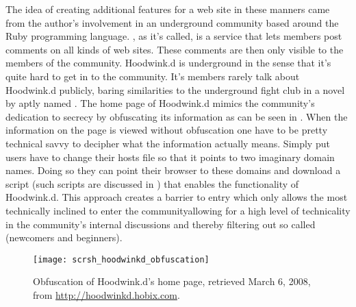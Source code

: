The idea of creating additional features for a web site in these manners
came from the author's involvement in an underground community based around
the Ruby%
programming language. %
,
as it's called, is a service that lets members post comments on all kinds of
web sites. These comments are then only visible to the members of the
community.
Hoodwink.d is underground in the sense that it's quite hard to get in to
the community. It's members rarely talk about Hoodwink.d publicly, baring
similarities to the underground fight club in a novel by \citet{palahniuk96}
aptly named %
.
The home page of Hoodwink.d mimics the community's dedication to secrecy
by obfuscating its information as can be seen in
.
When the information on the page is viewed without obfuscation%
one have to be pretty technical savvy to decipher what the information 
actually means. Simply put users have to change their hosts file
so that it points to two imaginary domain names. Doing so they can point their
browser to these domains and download a script (such scripts are discussed in
)
that enables the functionality
of Hoodwink.d.%
This approach creates a barrier to entry which only allows the most
technically inclined to enter the community\dash{}allowing for a
high level of technicality in the community's internal discussions
and thereby filtering out so called 
(newcomers and beginners).

\begin{figure}
  \centering
  \texttt{[image: scrsh\_hoodwinkd\_obfuscation]}
  \caption[Hoodwink.d Obfuscation]{
    Obfuscation of Hoodwink.d's home page,
    retrieved March 6, 2008, from
    \url{http://hoodwinkd.hobix.com}.
  }
  \label{figure:scrsh.hoodwinkd.obfuscation}
\end{figure}

